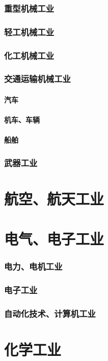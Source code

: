 \documentclass[UTF8]{../../RepresentationUniverse}
\begin{document}
    \subsubsection{重型机械工业}
    \subsubsection{轻工机械工业}
    \subsubsection{化工机械工业}
    \subsubsection{交通运输机械工业}
        \paragraph{汽车}
        \paragraph{机车、车辆}
        \paragraph{船舶}
    \subsubsection{武器工业}
\section{航空、航天工业}
\section{电气、电子工业}
    \subsubsection{电力、电机工业}
    \subsubsection{电子工业}
    \subsubsection{自动化技术、计算机工业}
\section{化学工业}
\end{document}
